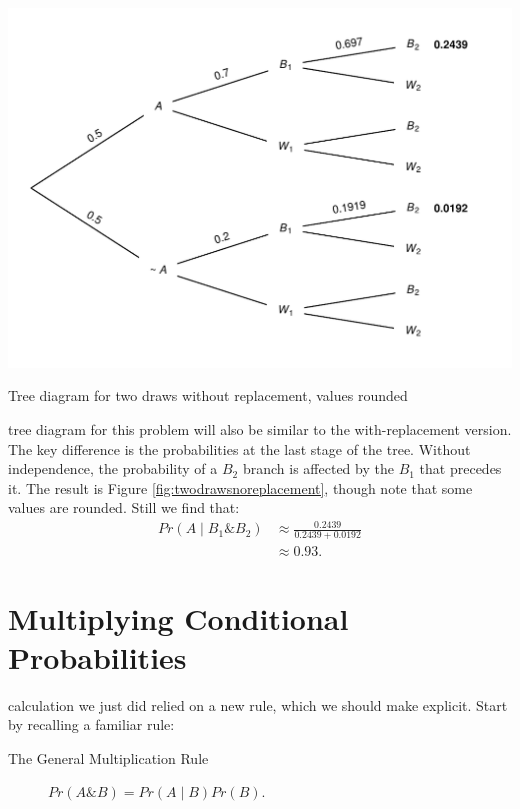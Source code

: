 \documentclass[justified]{tufte-book}
\newcommand{\given}{\mid}
\renewcommand{\wedge}{\mathbin{\&}}
\newcommand{\p}{Pr}
\theoremstyle{definition}
\theoremstyle{definition}
\theoremstyle{definition}
\theoremstyle{remark}
\begin{document}
\begin{marginfigure}
\includegraphics{_main_files/figure-latex/twodrawsnoreplacement-11} \caption[Tree diagram for two draws without replacement, values rounded]{Tree diagram for two draws without replacement, values rounded}\label{fig:twodrawsnoreplacement}
\end{marginfigure}

 tree diagram for this problem will also be similar to the with-replacement version. The key difference is the probabilities at the last stage of the tree. Without independence, the probability of a \(B_2\) branch is affected by the \(B_1\) that precedes it. The result is Figure \ref{fig:twodrawsnoreplacement}, though note that some values are rounded. Still we find that:
\[
  \begin{aligned}
     \p(A \given B_1 \wedge B_2) &\approx \frac{ 0.2439 }{ 0.2439 + 0.0192 } \\
                                 &\approx 0.93.
  \end{aligned}
\]

\hypertarget{multiplying-conditional-probabilities}{%
\section{Multiplying Conditional Probabilities}\label{multiplying-conditional-probabilities}}

 calculation we just did relied on a new rule, which we should make explicit. Start by recalling a familiar rule:

\begin{description}
\item[The General Multiplication Rule]
\(\p(A \wedge B) = \p(A \given B) \p(B).\)
\end{description}
\end{document}
